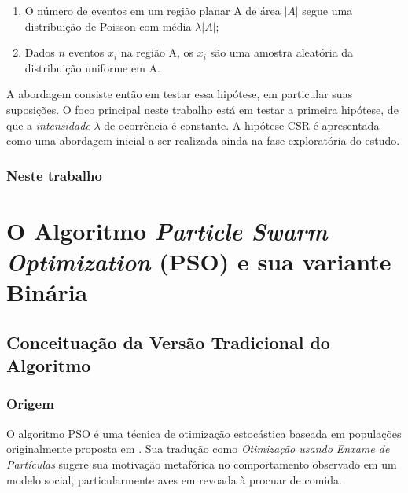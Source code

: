 \documentclass[
	12pt,				%
	openright,			%
	twoside,			%
	a4paper,			%
	english,			%
	french,				%
	spanish,			%
	brazil				%
	]{abntex2}
\begin{document}
\begin{enumerate}
\item O número de eventos em um região planar A de área $|A|$ segue uma distribuição de Poisson com média $\lambda |A|$;
\item Dados $n$ eventos $x_i$ na região A, os $x_i$ são uma amostra aleatória da distribuição uniforme em A.
\end{enumerate}

A abordagem consiste então em testar essa hipótese, em particular suas suposições. O foco principal neste trabalho está em testar a primeira hipótese, de que a \textit{intensidade} $\lambda$ de ocorrência é constante. A hipótese CSR é apresentada como uma abordagem inicial a ser realizada ainda na fase exploratória do estudo.

\section{Neste trabalho}
\label{sec:dmg}



\part{O Algoritmo \textit{Particle Swarm Optimization} (PSO) e sua variante Binária}
\chapter{Conceituação da Versão Tradicional do Algoritmo}

\section{Origem}

O algoritmo PSO é uma técnica de otimização estocástica baseada em populações originalmente proposta em \cite{eberhart1995new}. Sua tradução como \textit{Otimização usando Enxame de Partículas} sugere sua motivação metafórica no comportamento observado em um modelo social, particularmente aves em revoada à procuar de comida.  
\end{document}

